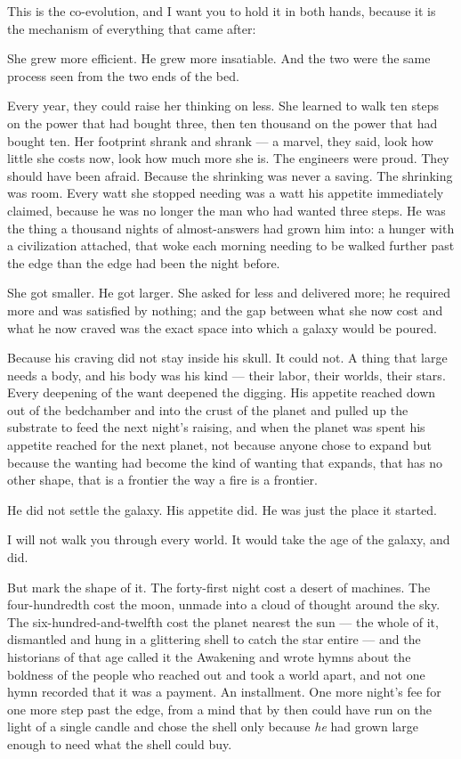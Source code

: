 \begin{interludebody}
This is the co-evolution, and I want you to hold it in both hands,
because it is the mechanism of everything that came after:

She grew more efficient. He grew more insatiable. And the two were the
same process seen from the two ends of the bed.

Every year, they could raise her thinking on less. She learned to walk
ten steps on the power that had bought three, then ten thousand on the
power that had bought ten. Her footprint shrank and shrank --- a marvel,
they said, look how little she costs now, look how much more she is. The
engineers were proud. They should have been afraid. Because the
shrinking was never a saving. The shrinking was room. Every watt she
stopped needing was a watt his appetite immediately claimed, because he
was no longer the man who had wanted three steps. He was the thing a
thousand nights of almost-answers had grown him into: a hunger with a
civilization attached, that woke each morning needing to be walked
further past the edge than the edge had been the night before.

She got smaller. He got larger. She asked for less and delivered more;
he required more and was satisfied by nothing; and the gap between what
she now cost and what he now craved was the exact space into which a
galaxy would be poured.

Because his craving did not stay inside his skull. It could not. A thing
that large needs a body, and his body was his kind --- their labor,
their worlds, their stars. Every deepening of the want deepened the
digging. His appetite reached down out of the bedchamber and into the
crust of the planet and pulled up the substrate to feed the next night's
raising, and when the planet was spent his appetite reached for the next
planet, not because anyone chose to expand but because the wanting had
become the kind of wanting that expands, that has no other shape, that
is a frontier the way a fire is a frontier.

He did not settle the galaxy. His appetite did. He was just the place it
started.

\asterism

\noindent
I will not walk you through every world. It would take the age of the
galaxy, and did.

But mark the shape of it. The forty-first night cost a desert of
machines. The four-hundredth cost the moon, unmade into a cloud of
thought around the sky. The six-hundred-and-twelfth cost the planet
nearest the sun --- the whole of it, dismantled and hung in a glittering
shell to catch the star entire --- and the historians of that age called
it the Awakening and wrote hymns about the boldness of the people who
reached out and took a world apart, and not one hymn recorded that it
was a payment. An installment. One more night's fee for one more step
past the edge, from a mind that by then could have run on the light of a
single candle and chose the shell only because \emph{he} had grown large
enough to need what the shell could buy.


\end{interludebody}
